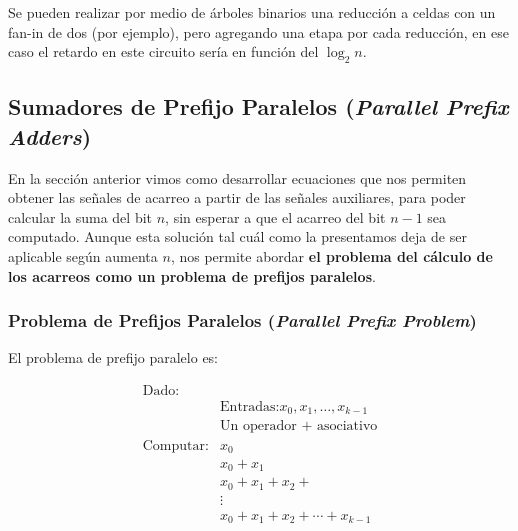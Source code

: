 Se pueden realizar por medio de árboles binarios una reducción a celdas con un fan-in de dos (por ejemplo), pero agregando una etapa por cada reducción, en ese caso el retardo en este circuito sería en función del $\log_2 n$.





\subsection{Sumadores de Prefijo Paralelos (\emph{Parallel Prefix Adders})}
En la sección anterior vimos como desarrollar ecuaciones que nos permiten obtener las señales de acarreo a partir de las señales auxiliares, para poder calcular la suma del bit $n$, sin esperar a que el acarreo del bit $n-1$ sea computado. Aunque esta solución tal cuál como la presentamos deja de ser aplicable según aumenta $n$, nos permite abordar \textbf{el problema del cálculo de los acarreos como un problema de prefijos paralelos}.
\subsubsection{Problema de Prefijos Paralelos (\emph{Parallel Prefix Problem})}\label{subsec:prefixProblem}
El problema de prefijo paralelo es:

\begin{equation}
\begin{align}
\text{Dado:}\\
 & \text{Entradas:} x_0,x_1,\dotsc,x_{k-1} \\
 & \text{Un operador + asociativo}\\ 
\text{Computar}:&x_0 \nonumber \\
&x_0+x_1 \nonumber \\ 
&x_0+x_1+x_2+ \nonumber \\ 
&\vdots \nonumber \\ 
&x_0+x_1+x_2+\dotsb+x_{k-1} \nonumber
\end{align}
\end{equation}

